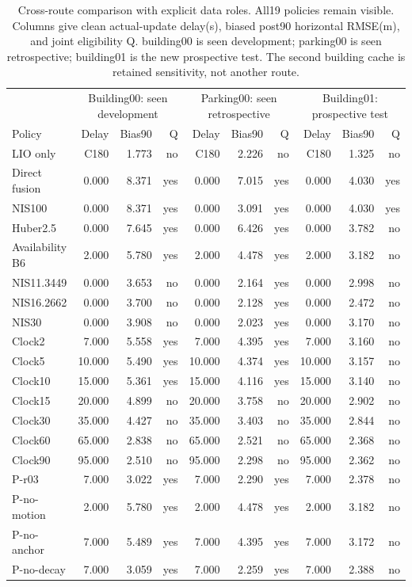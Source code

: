 \begin{table}[t]\centering\small
\caption{Cross-route comparison with explicit data roles. All19 policies remain visible. Columns give clean actual-update delay(s), biased post90 horizontal RMSE(m), and joint eligibility Q. building00 is seen development; parking00 is seen retrospective; building01 is the new prospective test. The second building cache is retained sensitivity, not another route.}\label{tab:other}
\begin{tabular}{lrrrrrrrrr}\toprule
 & \multicolumn{3}{c}{Building00: seen development} & \multicolumn{3}{c}{Parking00: seen retrospective} & \multicolumn{3}{c}{Building01: prospective test}\\
Policy & Delay & Bias90 & Q & Delay & Bias90 & Q & Delay & Bias90 & Q\\\midrule
LIO only & C180 & 1.773 & no & C180 & 2.226 & no & C180 & 1.325 & no \\
Direct fusion & 0.000 & 8.371 & yes & 0.000 & 7.015 & yes & 0.000 & 4.030 & yes \\
NIS100 & 0.000 & 8.371 & yes & 0.000 & 3.091 & yes & 0.000 & 4.030 & yes \\
Huber2.5 & 0.000 & 7.645 & yes & 0.000 & 6.426 & yes & 0.000 & 3.782 & no \\
Availability B6 & 2.000 & 5.780 & yes & 2.000 & 4.478 & yes & 2.000 & 3.182 & no \\
NIS11.3449 & 0.000 & 3.653 & no & 0.000 & 2.164 & yes & 0.000 & 2.998 & no \\
NIS16.2662 & 0.000 & 3.700 & no & 0.000 & 2.128 & yes & 0.000 & 2.472 & no \\
NIS30 & 0.000 & 3.908 & no & 0.000 & 2.023 & yes & 0.000 & 3.170 & no \\
Clock2 & 7.000 & 5.558 & yes & 7.000 & 4.395 & yes & 7.000 & 3.160 & no \\
Clock5 & 10.000 & 5.490 & yes & 10.000 & 4.374 & yes & 10.000 & 3.157 & no \\
Clock10 & 15.000 & 5.361 & yes & 15.000 & 4.116 & yes & 15.000 & 3.140 & no \\
Clock15 & 20.000 & 4.899 & no & 20.000 & 3.758 & no & 20.000 & 2.902 & no \\
Clock30 & 35.000 & 4.427 & no & 35.000 & 3.403 & no & 35.000 & 2.844 & no \\
Clock60 & 65.000 & 2.838 & no & 65.000 & 2.521 & no & 65.000 & 2.368 & no \\
Clock90 & 95.000 & 2.510 & no & 95.000 & 2.298 & no & 95.000 & 2.362 & no \\
P-r03 & 7.000 & 3.022 & yes & 7.000 & 2.290 & yes & 7.000 & 2.378 & no \\
P-no-motion & 2.000 & 5.780 & yes & 2.000 & 4.478 & yes & 2.000 & 3.182 & no \\
P-no-anchor & 7.000 & 5.489 & yes & 7.000 & 4.395 & yes & 7.000 & 3.172 & no \\
P-no-decay & 7.000 & 3.059 & yes & 7.000 & 2.259 & yes & 7.000 & 2.388 & no \\
\bottomrule\end{tabular}\end{table}
